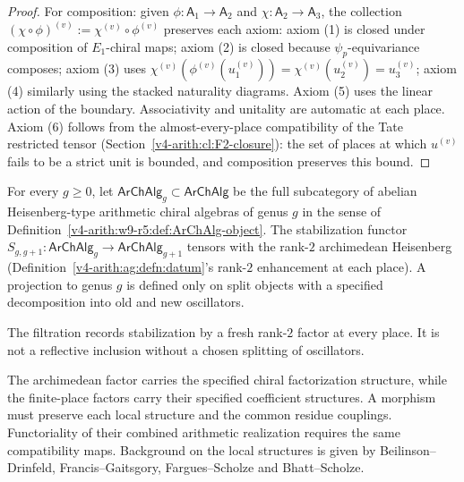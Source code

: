\begin{proof}
For composition: given \(\phi\colon\mathsf{A}_{1}\to\mathsf{A}_{2}\)
and \(\chi\colon\mathsf{A}_{2}\to\mathsf{A}_{3}\), the collection
\((\chi\circ\phi)^{(v)}:=\chi^{(v)}\circ\phi^{(v)}\) preserves each
axiom: axiom (1) is closed under composition of \(E_{1}\)-chiral maps;
axiom (2) is closed because \(\psi_{p}\)-equivariance composes; axiom
(3) uses \(\chi^{(v)}(\phi^{(v)}(u_{1}^{(v)}))=\chi^{(v)}(u_{2}^{(v)})=u_{3}^{(v)}\);
axiom (4) similarly using the stacked naturality diagrams. Axiom
(5) uses the linear action of the boundary. Associativity and
unitality are automatic at each place. Axiom (6) follows from the
almost-every-place compatibility of the Tate restricted tensor
(Section~\ref{v4-arith:cl:F2-closure}): the set of places at which
\(u^{(v)}\) fails to be a strict unit is bounded, and composition
preserves this bound.
\end{proof}

\begin{definition}
\label{v4-arith:w9-r5:def:genus-filtration}
For every \(g\geq 0\), let
\(\mathsf{ArChAlg}_{g}\subset\mathsf{ArChAlg}\) be the full subcategory
of abelian Heisenberg-type arithmetic chiral algebras of genus \(g\)
in the sense of Definition~\ref{v4-arith:w9-r5:def:ArChAlg-object}. The
stabilization functor
\(S_{g,g+1}\colon\mathsf{ArChAlg}_{g}\to\mathsf{ArChAlg}_{g+1}\)
tensors with the rank-\(2\) archimedean Heisenberg
(Definition~\ref{v4-arith:ag:defn:datum}'s rank-\(2\) enhancement at each
place). A projection to genus \(g\) is defined only on split objects
with a specified decomposition into old and new oscillators.
\end{definition}

\begin{remark}
\label{v4-arith:w9-r5:rem:filtration-reason}
The filtration records stabilization by a fresh rank-\(2\) factor at
every place. It is not a reflective inclusion without a chosen
splitting of oscillators.
\end{remark}

\begin{remark}
\label{v4-arith:w9-r5:rem:source-anchors}
The archimedean factor carries the specified chiral factorization
structure, while the finite-place factors carry their specified
coefficient structures. A morphism must preserve each local structure
and the common residue couplings. Functoriality of their combined
arithmetic realization requires the same compatibility maps.
Background on the local structures is given by Beilinson--Drinfeld,
Francis--Gaitsgory, Fargues--Scholze and Bhatt--Scholze.
\end{remark}

